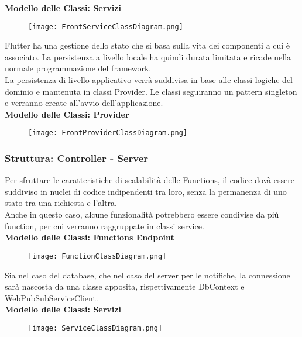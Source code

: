 \textbf{Modello delle Classi: Servizi}\\
\begin{figure}[h!]
    \begin{center}
        \texttt{[image: FrontServiceClassDiagram.png]}
    \end{center}
\end{figure}
\clearpage
Flutter ha una gestione dello stato che si basa sulla vita dei componenti a cui è associato. 
La persistenza a livello locale ha quindi durata limitata e ricade nella normale programmazione del framework.\\
La persistenza di livello applicativo verrà suddivisa in base alle classi logiche del dominio e mantenuta in classi Provider. 
Le classi seguiranno un pattern singleton e verranno create all'avvio dell'applicazione.\\
\textbf{Modello delle Classi: Provider}\\
\begin{figure}[h!]
    \begin{center}
        \texttt{[image: FrontProviderClassDiagram.png]}
    \end{center}
\end{figure}
\clearpage

\subsubsection{Struttura: Controller - Server}
Per sfruttare le caratteristiche di scalabilità delle Functions, il codice dovà essere suddiviso in nuclei di codice indipendenti tra loro, senza la permanenza di uno stato tra una richiesta e l'altra.\\
Anche in questo caso, alcune funzionalità potrebbero essere condivise da più function, per cui verranno raggruppate in classi service.\\
\textbf{Modello delle Classi: Functions Endpoint}\\
\begin{figure}[h!]
    \begin{center}
        \texttt{[image: FunctionClassDiagram.png]}
    \end{center}
\end{figure}
\clearpage
Sia nel caso del database, che nel caso del server per le notifiche, la connessione sarà nascosta da una classe apposita, rispettivamente DbContext e WebPubSubServiceClient.\\
\textbf{Modello delle Classi: Servizi}\\
\begin{figure}[h!]
    \begin{center}
        \texttt{[image: ServiceClassDiagram.png]}
    \end{center}
\end{figure}

